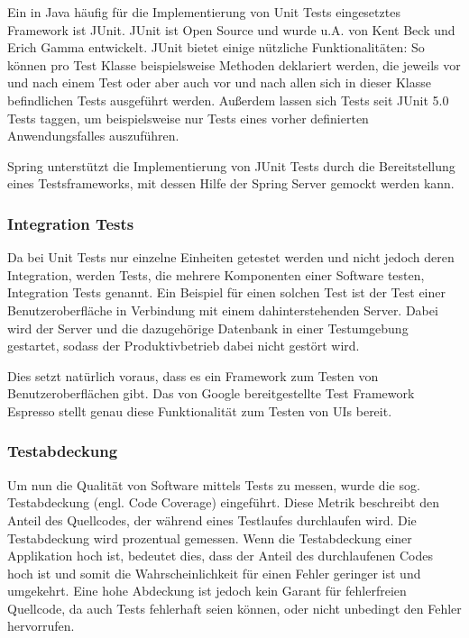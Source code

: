 				Ein in Java häufig für die Implementierung von Unit Tests eingesetztes Framework ist JUnit. JUnit ist Open Source und wurde u.A. von Kent Beck und Erich Gamma entwickelt. JUnit bietet einige nützliche Funktionalitäten: So können pro Test Klasse beispielsweise Methoden deklariert werden, die jeweils vor und nach einem Test oder aber auch vor und nach allen sich in dieser Klasse befindlichen Tests ausgeführt werden. Außerdem lassen sich Tests seit JUnit 5.0 Tests taggen, um beispielsweise nur Tests eines vorher definierten Anwendungsfalles auszuführen. \cite{Team.312020}
				
				Spring unterstützt die Implementierung von JUnit Tests durch die Bereitstellung eines Testsframeworks, mit dessen Hilfe der Spring Server gemockt werden kann. 
				
			\subsubsection{Integration Tests}
			\label{qm.integration_tests}
			
				Da bei Unit Tests nur einzelne Einheiten getestet werden und nicht jedoch deren Integration, werden Tests, die mehrere Komponenten einer Software testen, Integration Tests genannt. Ein Beispiel für einen solchen Test ist der Test einer Benutzeroberfläche in Verbindung mit einem dahinterstehenden Server. Dabei wird der Server und die dazugehörige Datenbank in einer Testumgebung gestartet, sodass der Produktivbetrieb dabei nicht gestört wird. 
				
				Dies setzt natürlich voraus, dass es ein Framework zum Testen von Benutzeroberflächen gibt. Das von Google bereitgestellte Test Framework Espresso stellt genau diese Funktionalität zum Testen von \acs{UI}s bereit. 
			
			\subsubsection{Testabdeckung}
			\label{qm.tests.testabdeckung}
			
				Um nun die Qualität von Software mittels Tests zu messen, wurde die sog. Testabdeckung (engl. Code Coverage) eingeführt. Diese Metrik beschreibt den Anteil des Quellcodes, der während eines Testlaufes durchlaufen wird. Die Testabdeckung wird prozentual gemessen. Wenn die Testabdeckung einer Applikation hoch ist, bedeutet dies, dass der Anteil des durchlaufenen Codes hoch ist und somit die Wahrscheinlichkeit für einen Fehler geringer ist und umgekehrt. Eine hohe Abdeckung ist jedoch kein Garant für fehlerfreien Quellcode, da auch Tests fehlerhaft seien können, oder nicht unbedingt den Fehler hervorrufen. \cite{Fowler.2292020b}
				
